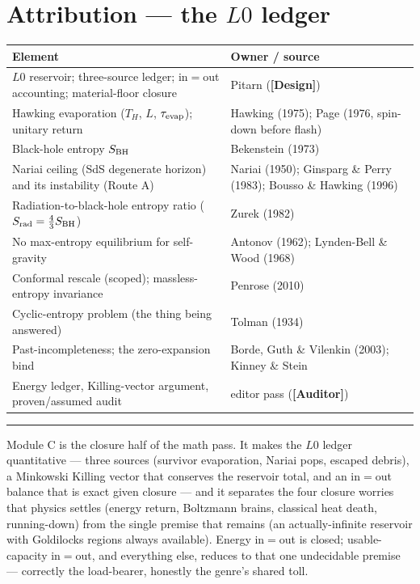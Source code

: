 \documentclass[11pt]{article}
\newcommand{\Design}{\textbf{\textcolor{purple!65!black}{[Design]}}}
\newcommand{\Auditor}{\textbf{\textcolor{teal!55!black}{[Auditor]}}}
\begin{document}
\section{Attribution --- the $L0$ ledger}
\begin{center}\small
\begin{tabular}{@{}p{}p{}@{}}
\toprule
Element & Owner / source \\
\midrule
$L0$ reservoir; three-source ledger; in$=$out accounting; material-floor closure & Pitarn (\Design) \\
Hawking evaporation ($T_H$, $L$, $\tau_{\rm evap}$); unitary return & Hawking (1975); Page (1976, spin-down before flash) \\
Black-hole entropy $S_{\rm BH}$ & Bekenstein (1973) \\
Nariai ceiling (SdS degenerate horizon) and its instability (Route A) & Nariai (1950); Ginsparg \& Perry (1983); Bousso \& Hawking (1996) \\
Radiation-to-black-hole entropy ratio ($S_{\rm rad}=\tfrac43 S_{\rm BH}$) & Zurek (1982) \\
No max-entropy equilibrium for self-gravity & Antonov (1962); Lynden-Bell \& Wood (1968) \\
Conformal rescale (scoped); massless-entropy invariance & Penrose (2010) \\
Cyclic-entropy problem (the thing being answered) & Tolman (1934) \\
Past-incompleteness; the zero-expansion bind & Borde, Guth \& Vilenkin (2003); Kinney \& Stein \\
Energy ledger, Killing-vector argument, proven/assumed audit & editor pass (\Auditor) \\
\bottomrule
\end{tabular}
\end{center}

\vspace{4pt}\hrule\vspace{4pt}
{\small Module C is the closure half of the math pass. It makes the $L0$ ledger quantitative --- three sources (survivor evaporation, Nariai pops, escaped debris), a Minkowski Killing vector that conserves the reservoir total, and an in$=$out balance that is exact given closure --- and it separates the four closure worries that physics settles (energy return, Boltzmann brains, classical heat death, running-down) from the single premise that remains (an actually-infinite reservoir with Goldilocks regions always available). Energy in$=$out is closed; usable-capacity in$=$out, and everything else, reduces to that one undecidable premise --- correctly the load-bearer, honestly the genre's shared toll.}
\end{document}
